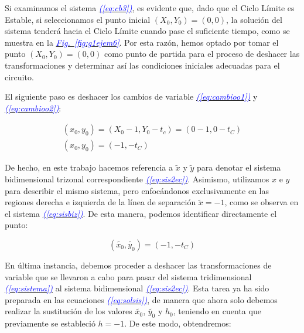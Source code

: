 \documentclass[12pt,a4paper]{report} %
\newcommand{\fref}[1]{\hyperref[#1]{\textcolor{blue}{\textit{Fig.~\ref*{#1}}}}}
\newcommand{\eref}[1]{\hyperref[#1]{\textcolor{blue}{\textit{(\ref*{#1})}}}}
\begin{document}
	\vspace{0.5cm}Si examinamos el sistema \eref{eq:cb3}, es evidente que, dado que el Ciclo Límite es Estable, si seleccionamos el punto inicial $(X_0, Y_0) = (0, 0)$, la solución del sistema tenderá hacia el Ciclo Límite cuando pase el suficiente tiempo, como se muestra en la \fref{fig:g1ejem6}. Por esta razón, hemos optado por tomar el punto $(X_0, Y_0) = (0, 0)$ como punto de partida para el proceso de deshacer las transformaciones y determinar así las condiciones iniciales adecuadas para el circuito.
	
	\vspace{0.5cm}\noindent El siguiente paso es deshacer los cambios de variable \eref{eq:cambioo1} y \eref{eq:cambioo2}:
	
	\begin{equation}
		\label{eq:desh1}
		\begin{gathered}
			(x_0,y_0)=\left( X_0-1,Y_0-t_c \right) = (0-1,0-t_C) \\[5mm]
			(x_0,y_0)=(-1,-t_C)
		\end{gathered}
	\end{equation}\smallskip
	
	De hecho, en este trabajo hacemos referencia a $\tilde{x}$ y $\tilde{y}$ para denotar el sistema bidimensional trizonal correspondiente \eref{eq:sis2ec}. Asimismo, utilizamos $x$ e $y$ para describir el mismo sistema, pero enfocándonos exclusivamente en las regiones derecha e izquierda de la línea de separación $\tilde{x}=-1$, como se observa en el sistema \eref{eq:sisbiz}. De esta manera, podemos identificar directamente el punto:	
	
	\begin{equation}
		\label{eq:desh2}
		(\tilde{x_0},\tilde{y_0}) = (-1,-t_C)
	\end{equation}\smallskip
	
	En última instancia, debemos proceder a deshacer las transformaciones de variable que se llevaron a cabo para pasar del sistema tridimensional \eref{eq:sistema} al sistema bidimensional \eref{eq:sis2ec}. Esta tarea ya ha sido preparada en las ecuaciones \eref{eq:solsis}, de manera que ahora solo debemos realizar la sustitución de los valores $\tilde{x_0}$, $\tilde{y_0}$ y $h_0$, teniendo en cuenta que previamente se estableció $h = -1$. De este modo, obtendremos:
	
\end{document}
